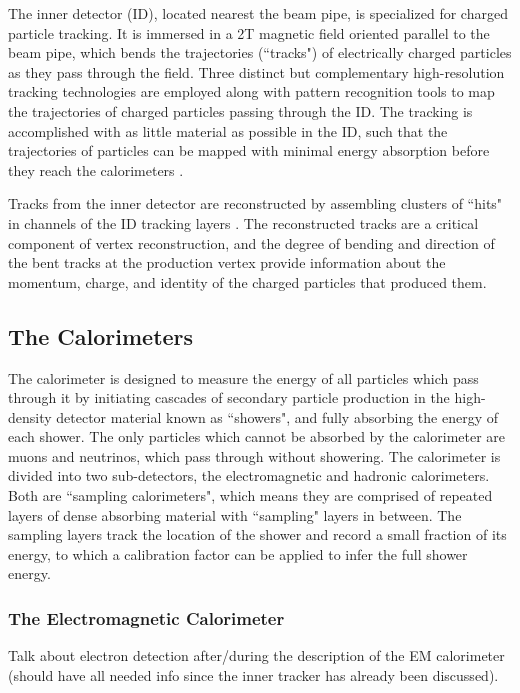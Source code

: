 The inner detector (ID), located nearest the beam pipe, is specialized for charged particle tracking. It is immersed in a 2T magnetic field oriented parallel to the beam pipe, which bends the trajectories (``tracks") of electrically charged particles as they pass through the field. Three distinct but complementary high-resolution tracking technologies are employed along with pattern recognition tools to map the trajectories of charged particles passing through the ID. The tracking is accomplished with as little material as possible in the ID, such that the trajectories of particles can be mapped with minimal energy absorption before they reach the calorimeters \cite{id_thesis}. 

Tracks from the inner detector are reconstructed by assembling clusters of ``hits" in channels of the ID tracking layers \cite{electron_reco}. The reconstructed tracks are a critical component of vertex reconstruction, and the degree of bending and direction of the bent tracks at the production vertex provide information about the momentum, charge, and identity of the charged particles that produced them. 


\subsection{The Calorimeters}

The calorimeter is designed to measure the energy of all particles which pass through it by initiating cascades of secondary particle production in the high-density detector material known as ``showers", and fully absorbing the energy of each shower. The only particles which cannot be absorbed by the calorimeter are muons and neutrinos, which pass through without showering. The calorimeter is divided into two sub-detectors, the electromagnetic and hadronic calorimeters. Both are ``sampling calorimeters", which means they are comprised of repeated layers of dense absorbing material with ``sampling" layers in between. The sampling layers track the location of the shower and record a small fraction of its energy, to which a calibration factor can be applied to infer the full shower energy. 

\subsubsection{The Electromagnetic Calorimeter}
\label{sec:EM_calo}

Talk about electron detection after/during the description of the EM calorimeter (should have all needed info since the inner tracker has already been discussed). 

